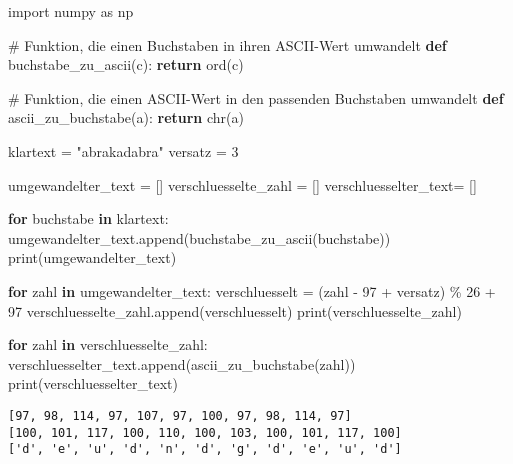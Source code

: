 \documentclass[
  letterpaper,
  DIV=11,
  numbers=noendperiod]{scrreprt}
\newenvironment{Shaded}{\begin{snugshade}}{\end{snugshade}}
\newcommand{\BuiltInTok}[1]{\textcolor[rgb]{0.00,0.23,0.31}{#1}}
\newcommand{\CommentTok}[1]{\textcolor[rgb]{0.37,0.37,0.37}{#1}}
\newcommand{\ControlFlowTok}[1]{\textcolor[rgb]{0.00,0.23,0.31}{\textbf{#1}}}
\newcommand{\DecValTok}[1]{\textcolor[rgb]{0.68,0.00,0.00}{#1}}
\newcommand{\ImportTok}[1]{\textcolor[rgb]{0.00,0.46,0.62}{#1}}
\newcommand{\KeywordTok}[1]{\textcolor[rgb]{0.00,0.23,0.31}{\textbf{#1}}}
\newcommand{\NormalTok}[1]{\textcolor[rgb]{0.00,0.23,0.31}{#1}}
\newcommand{\OperatorTok}[1]{\textcolor[rgb]{0.37,0.37,0.37}{#1}}
\newcommand{\StringTok}[1]{\textcolor[rgb]{0.13,0.47,0.30}{#1}}
\begin{document}
\begin{tcolorbox}
\begin{tcolorbox}
\begin{tcolorbox}
\begin{Shaded}
\begin{Highlighting}[]
\ImportTok{import}\NormalTok{ numpy }\ImportTok{as}\NormalTok{ np}

\CommentTok{\# Funktion, die einen Buchstaben in ihren ASCII{-}Wert umwandelt}
\KeywordTok{def}\NormalTok{ buchstabe\_zu\_ascii(c):}
    \ControlFlowTok{return} \BuiltInTok{ord}\NormalTok{(c)}

\CommentTok{\# Funktion, die einen ASCII{-}Wert in den passenden Buchstaben umwandelt}
\KeywordTok{def}\NormalTok{ ascii\_zu\_buchstabe(a):}
    \ControlFlowTok{return} \BuiltInTok{chr}\NormalTok{(a)}

\NormalTok{klartext }\OperatorTok{=} \StringTok{"abrakadabra"}
\NormalTok{versatz }\OperatorTok{=} \DecValTok{3}

\NormalTok{umgewandelter\_text }\OperatorTok{=}\NormalTok{ []}
\NormalTok{verschluesselte\_zahl }\OperatorTok{=}\NormalTok{ []}
\NormalTok{verschluesselter\_text}\OperatorTok{=}\NormalTok{ []}



\ControlFlowTok{for}\NormalTok{ buchstabe }\KeywordTok{in}\NormalTok{ klartext:}
\NormalTok{    umgewandelter\_text.append(buchstabe\_zu\_ascii(buchstabe))}
\BuiltInTok{print}\NormalTok{(umgewandelter\_text)}


\ControlFlowTok{for}\NormalTok{ zahl }\KeywordTok{in}\NormalTok{ umgewandelter\_text:    }
\NormalTok{    verschluesselt }\OperatorTok{=}\NormalTok{ (zahl }\OperatorTok{{-}} \DecValTok{97} \OperatorTok{+}\NormalTok{ versatz) }\OperatorTok{\%} \DecValTok{26} \OperatorTok{+} \DecValTok{97}
\NormalTok{    verschluesselte\_zahl.append(verschluesselt)}
\BuiltInTok{print}\NormalTok{(verschluesselte\_zahl)}


\ControlFlowTok{for}\NormalTok{ zahl }\KeywordTok{in}\NormalTok{ verschluesselte\_zahl:    }
\NormalTok{    verschluesselter\_text.append(ascii\_zu\_buchstabe(zahl))}
\BuiltInTok{print}\NormalTok{(verschluesselter\_text)}
\end{Highlighting}
\end{Shaded}

\begin{verbatim}
[97, 98, 114, 97, 107, 97, 100, 97, 98, 114, 97]
[100, 101, 117, 100, 110, 100, 103, 100, 101, 117, 100]
['d', 'e', 'u', 'd', 'n', 'd', 'g', 'd', 'e', 'u', 'd']
\end{verbatim}

\end{tcolorbox}


\end{tcolorbox}
\end{tcolorbox}
\end{document}
